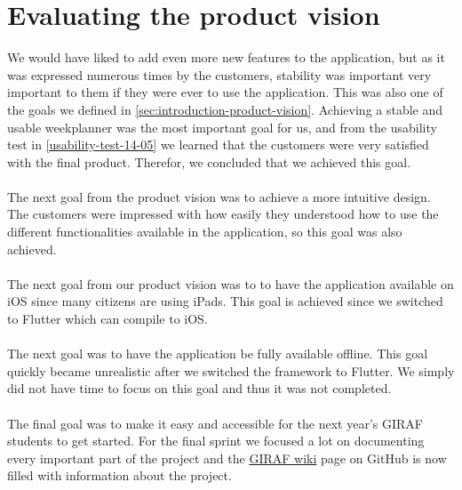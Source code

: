\section{Evaluating the product vision}
We would have liked to add even more new features to the application, but as it was expressed numerous times by the customers, stability was important very important to them if they were ever to use the application.
This was also one of the goals we defined in \autoref{sec:introduction-product-vision}.
Achieving a stable and usable weekplanner was the most important goal for us, and from the usability test in \autoref{usability-test-14-05} we learned that the customers were very satisfied with the final product.
Therefor, we concluded that we achieved this goal. 
\\\\
The next goal from the product vision was to achieve a more intuitive design.
The customers were impressed with how easily they understood how to use the different functionalities available in the application, so this goal was also achieved. 
\\\\
The next goal from our product vision was to to have the application available on iOS since many citizens are using iPads.
This goal is achieved since we switched to Flutter which can compile to iOS.
\\\\
The next goal was to have the application be fully available offline.
This goal quickly became unrealistic after we switched the framework to Flutter.
We simply did not have time to focus on this goal and thus it was not completed.
\\\\
The final goal was to make it easy and accessible for the next year's GIRAF students to get started.
For the final sprint we focused a lot on documenting every important part of the project and the \href{https://github.com/aau-giraf/wiki}{GIRAF wiki} page on GitHub is now filled with information about the project. 
